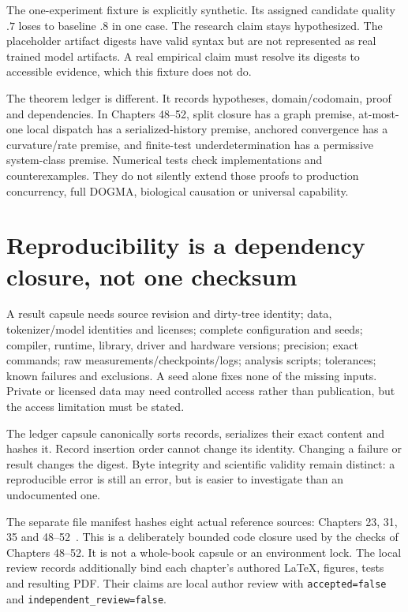 \begin{center}\end{center}
The one-experiment fixture is explicitly synthetic. Its assigned candidate
quality $.7$ loses to baseline $.8$ in one case. The research claim stays
hypothesized. The placeholder artifact digests have valid syntax but are not
represented as real trained model artifacts. A real empirical claim must
resolve its digests to accessible evidence, which this fixture does not do.

The theorem ledger is different. It records hypotheses, domain/codomain,
proof and dependencies. In Chapters 48--52, split closure has a graph premise,
at-most-one local dispatch has a serialized-history premise, anchored
convergence has a curvature/rate premise, and finite-test underdetermination
has a permissive system-class premise. Numerical tests check implementations
and counterexamples. They do not silently extend those proofs to production
concurrency, full DOGMA, biological causation or universal capability.

\section{Reproducibility is a dependency closure, not one checksum}
A result capsule needs source revision and dirty-tree identity; data,
tokenizer/model identities and licenses; complete configuration and seeds;
compiler, runtime, library, driver and hardware versions; precision; exact
commands; raw measurements/checkpoints/logs; analysis scripts; tolerances;
known failures and exclusions. A seed alone fixes none of the missing inputs.
Private or licensed data may need controlled access rather than publication,
but the access limitation must be stated.

The ledger capsule canonically sorts records, serializes their exact content
and hashes it. Record insertion order cannot change its identity. Changing a
failure or result changes the digest. Byte integrity and scientific validity
remain distinct: a reproducible error is still an error, but is easier to
investigate than an undocumented one.

The separate file manifest hashes eight actual reference sources: Chapters
23, 31, 35 and 48--52~\cite{evod52:local}. This is a deliberately bounded code closure used by
the checks of Chapters 48--52. It is not a whole-book capsule or an environment lock.
The local review records additionally bind each chapter's authored LaTeX,
figures, tests and resulting PDF. Their claims are local author review with
\texttt{accepted=false} and \texttt{independent\_review=false}.

